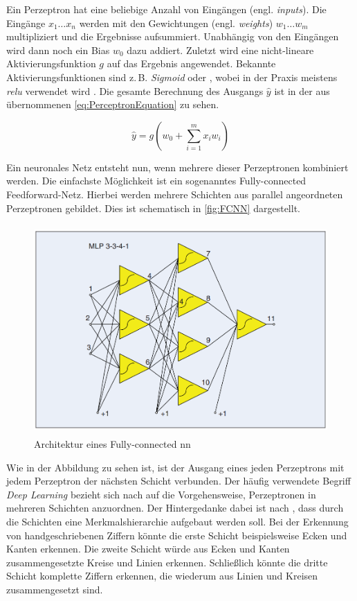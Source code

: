 Ein Perzeptron hat eine beliebige Anzahl von Eingängen (engl. \emph{inputs}).
Die Eingänge $x_1 \dots x_n$ werden mit den Gewichtungen (engl. \emph{weights}) $w_1 \dots w_m$ multipliziert und die Ergebnisse aufsummiert.
Unabhängig von den Eingängen wird dann noch ein Bias $w_0$ dazu addiert.
Zuletzt wird eine nicht-lineare Aktivierungsfunktion $g$ auf das Ergebnis angewendet.
Bekannte Aktivierungsfunktionen sind z.\,B. \emph{Sigmoid} oder \emph{}, wobei in der Praxis meistens \emph{\acrshort{relu}} verwendet wird \cite{ActivFuncSharma,ActivFuncNwankpa}.
Die gesamte Berechnung des Ausgangs $\hat{y}$ ist in der aus \cite{6S191Intro} übernommenen \autoref{eq:PerceptronEquation} zu sehen.

\begin{equation}
    \hat{y} = g\left(w_0 + \sum_{i=1}^{m} x_i w_i \right)
\label{eq:PerceptronEquation}
\end{equation}

Ein neuronales Netz entsteht nun, wenn mehrere dieser Perzeptronen kombiniert werden.
Die einfachste Möglichkeit ist ein sogenanntes Fully-connected Feedforward-Netz.
Hierbei werden mehrere Schichten aus parallel angeordneten Perzeptronen gebildet.
Dies ist schematisch in \autoref{fig:FCNN} dargestellt.

\begin{figure}[h]
    \centering
    \includegraphics[width=1\textwidth,height=8cm,keepaspectratio=true]{content/images/FCNN.png}
    \caption{Architektur eines Fully-connected \acrshort{nn} \cite[FIGURE 1]{NNArchitectures}}
    \label{fig:FCNN}
\end{figure}

Wie in der Abbildung zu sehen ist, ist der Ausgang eines jeden Perzeptrons mit jedem Perzeptron der nächsten Schicht verbunden.
Der häufig verwendete Begriff \emph{Deep Learning} bezieht sich nach \cite[S. 27]{DeepLearningPythonKeras} auf die Vorgehensweise, Perzeptronen in mehreren Schichten anzuordnen.
Der Hintergedanke dabei ist nach \cite{6S191Intro}, dass durch die Schichten eine Merkmalshierarchie aufgebaut werden soll.
Bei der Erkennung von handgeschriebenen Ziffern könnte die erste Schicht beispielsweise Ecken und Kanten erkennen.
Die zweite Schicht würde aus Ecken und Kanten zusammengesetzte Kreise und Linien erkennen.
Schließlich könnte die dritte Schicht komplette Ziffern erkennen, die wiederum aus Linien und Kreisen zusammengesetzt sind.

